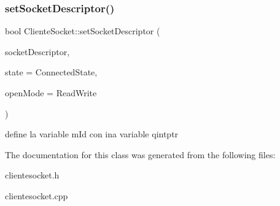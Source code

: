 \subsubsection{\texorpdfstring{set\+Socket\+Descriptor()}{setSocketDescriptor()}}
{\footnotesize\ttfamily bool Cliente\+Socket\+::set\+Socket\+Descriptor (\begin{DoxyParamCaption}\item[{qintptr}]{socket\+Descriptor,  }\item[{Socket\+State}]{state = {\ttfamily ConnectedState},  }\item[{Open\+Mode}]{open\+Mode = {\ttfamily ReadWrite} }\end{DoxyParamCaption})\hspace{0.3cm}{\ttfamily [override]}}

define la variable m\+Id con ina variable qintptr 

The documentation for this class was generated from the following files\+:\begin{DoxyCompactItemize}
\item 
clientesocket.\+h\item 
clientesocket.\+cpp\end{DoxyCompactItemize}
